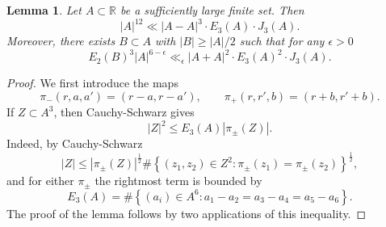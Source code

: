 \documentclass[10pt,a4paper]{amsart}
\newtheorem{lemma}{Lemma}
\newcommand{\e}{\epsilon}
\begin{document}
\begin{lemma}\label{lem:projection-estimate}
    Let \(A \subset \mathbb{R} \) be a sufficiently large finite set. Then
    \[
    \left\lvert A \right\rvert ^{12} \ll \left\lvert A-A \right\rvert ^{3}  \cdot E_3(A) \cdot  J_3(A)
    .\]
    Moreover, there exists \(B \subset A\) with \(\left\lvert B \right\rvert \geq \left\lvert A \right\rvert / 2\) such that for any \(\e > 0\)
    \[
    E_2(B) ^{3} \left\lvert A \right\rvert ^{6 - \e} \ll _{\e} \left\lvert A+A \right\rvert ^{2} \cdot E_3(A) ^{2} \cdot J_3(A)
    .\]
\end{lemma}

\begin{proof}
    We first introduce the maps
    \begin{equation}
    \label{eq:projection-maps}
        \pi_{-} (r,a,a') = (r-a, r-a') , \qquad \pi_{+} (r,r',b) = (r+b , r'+b).
    \end{equation}
    If \(Z \subset A ^{3} \), then Cauchy-Schwarz gives
    \begin{equation} 
    \label{eq:cauchy-schwarz-projection}
        \left\lvert Z \right\rvert ^{2} \leq E_3(A) \left\lvert \pi_{\pm } (Z) \right\rvert .
    \end{equation}
    Indeed, by Cauchy-Schwarz
    \[
    \left\lvert Z \right\rvert \leq  \left\lvert \pi_{\pm } (Z) \right\rvert ^{\frac{1}{2} } \# \left\{ (z_1,z_2) \in Z ^{2} : \pi_{\pm } (z_1) = \pi _{\pm } (z_2) \right\} ^{\frac{1}{2} }
    ,\]
    and for either \(\pi _{\pm } \) the rightmost term is bounded by
    \[
    E_3(A) = \# \left\{ (a_{i} )\in A^{6}: a_1 - a_2 = a_3 - a_4 = a_5 - a_6 \right\} 
    .\]
    The proof of the lemma follows by two applications of this inequality.
    
    \bigskip  
    

\end{proof}
\end{document}
